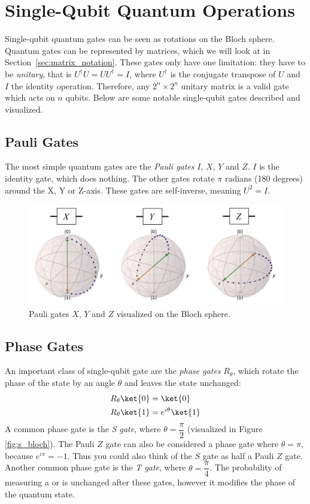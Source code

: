 \documentclass[11pt, notitlepage]{report}
\begin{document}
\section{Single-Qubit Quantum Operations}
Single-qubit quantum gates can be seen as rotations on the Bloch sphere. Quantum gates can be represented by matrices, which we will look at in Section~\ref{sec:matrix_notation}. These gates only have one limitation: they have to be \emph{unitary}, that is $U^\dagger U = UU^\dagger = I$, where $U^\dagger$ is the conjugate transpose of $U$ and $I$ the identity operation. Therefore, any $2^n \times 2^n$ unitary matrix is a valid gate which acts on $n$ qubits. Below are some notable single-qubit gates described and visualized.

\subsection{Pauli Gates}
 The most simple quantum gates are the \emph{Pauli gates} $I$, $X$, $Y$ and $Z$. $I$ is the identity gate, which does nothing. The other gates rotate $\pi$ radians (180 degrees) around the X, Y or Z-axis. These gates are self-inverse, meaning $U^2 = I$.

\begin{figure}[ht]
  \begin{adjustwidth}{-2.5cm}{-2.5cm}
  \centering
  \includegraphics[scale=0.2]{images/pauli_gates.eps}
  \caption{Pauli gates $X$, $Y$ and $Z$ visualized on the Bloch sphere.}
  \end{adjustwidth}
\end{figure}


\subsection{Phase Gates}
An important class of single-qubit gate are the \emph{phase gates} $R_\theta$, which rotate the phase of the  state by an angle $\theta$ and leaves the  state unchanged:
\begin{align*}
R_\theta \ket{0} &= \ket{0} \\
R_\theta \ket{1} &= e^{i\theta}\ket{1}
\end{align*}
A common phase gate is the \emph{S gate}, where $\theta = \dfrac{\pi}{2}$ (visualized in Figure \ref{fig:s_bloch}). The Pauli $Z$ gate can also be considered a phase gate where $\theta = \pi$, because $e^{i\pi} = -1$. Thus you could also think of the $S$ gate as half a Pauli $Z$ gate. Another common phase gate is the \emph{T gate}, where $\theta = \dfrac{\pi}{4}$. The probability of measuring a  or  is unchanged after these gates, however it modifies the phase of the quantum state.
\end{document}
